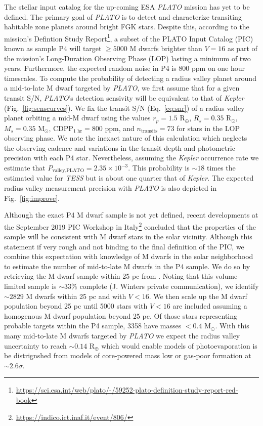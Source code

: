 \documentclass[twocolumn]{emulateapj}
\newcommand{\kepler}[1]{\emph{Kepler}#1}
\newcommand{\tess}[1]{\emph{TESS}#1}
\newcommand{\plato}[1]{\emph{PLATO}#1}
\begin{document}
The stellar input catalog for the up-coming ESA \plato{} mission \citep{rauer14} has yet to be defined. The primary goal
of \plato{} is to detect and characterize transiting habitable zone planets around bright FGK stars. Despite this,
according to the mission's Defintion Study
Report\footnote{\url{https://sci.esa.int/web/plato/-/59252-plato-definition-study-report-red-book}}, a subset of 
the PLATO Input Catalog (PIC) known as sample P4 will target $\geq 5000$ M dwarfs brighter than $V=16$ as part of
the mission's Long-Duration Observing Phase (LOP) lasting a minimum of two years. Furthermore, the expected random
noise in P4 is 800 ppm on one hour timescales. To compute the probability of
detecting a radius valley planet around a mid-to-late M dwarf targeted by \plato{,} we first assume that for a given
transit S/N, \plato{'s} detection sensivity will be equivalent to that of \kepler{} (Fig.~\ref{fig:senscurves}).
We fix the transit S/N
(Eq.~\ref{eq:snr}) of a radius valley planet orbiting a mid-M dwarf using the values $r_p=1.5$ R$_{\oplus}$, $R_s=0.35$
R$_{\odot}$, $M_s=0.35$ M$_{\odot}$, CDPP$_{1\text{ hr}}=800$ ppm, and $n_{\text{transits}}=73$ for stars in the LOP observing
phase. We note the inexact nature of this calculation which
neglects the observing cadence and variations in the transit depth and photometric precision with each P4 star.
Nevertheless, assuming the \kepler{} occurrence rate we estimate that $P_{\text{valley,PLATO}}=2.35 \times 10^{-3}$. This
probability is $\sim 18$ times the estimated value for \tess{} but is about one quarter that of \kepler{.} The expected
radius valley measurement precision with \plato{} is also depicted in Fig.~\ref{fig:improve}. 

Although the exact P4 M dwarf sample is not yet defined, recent developments
at the September 2019 PIC Workshop in Italy\footnote{\url{https://indico.ict.inaf.it/event/806/}} concluded that the
properties of the sample will be consistent with M dwarf stars in the solar vicinity. Although this statement
if very rough and not binding to the final definition of the PIC, we combine this expectation with knowledge of M dwarfs
in the solar neighborhood to estimate the number of mid-to-late M dwarfs in the P4 sample. We do so by retrieving
the M dwarf sample within 25 pc from \cite{winters19}. Noting that this volume-limited sample is $\sim 33$\% complete
(J. Winters private communication), we identify $\sim 2829$ M dwarfs within 25 pc and with $V<16$.
We then scale up the M dwarf population beyond 25 pc until 5000 stars with $V<16$ are included assuming a homogenous M
dwarf population beyond 25 pc. Of those stars representing probable targets within the P4 sample, 3358 have masses
$<0.4$ M$_{\odot}$. With this many mid-to-late M dwarfs targeted by \plato{} we expect the radius valley uncertainty
to reach $\sim 0.14$ R$_{\oplus}$ which would enable models of photoevaporation is be distrignshed from models of
core-powered mass low or gas-poor formation at $\sim 2.6\sigma$.
\end{document}
